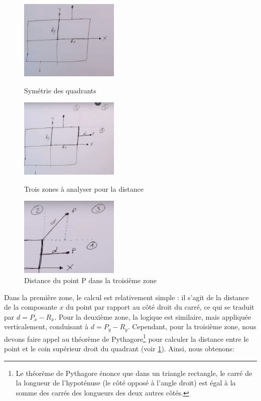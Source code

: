 \begin{figure}[h]
  \begin{minipage}[b]{0.30\linewidth}
    \centering
    \includegraphics[width=\linewidth, height=1.5in]{images//shaders/box00.png}
    \caption{Symétrie des quadrants}
    \label{box00}
  \end{minipage}
  \hspace{0.02\linewidth} %
  \begin{minipage}[b]{0.30\linewidth}
    \centering
    \includegraphics[width=\linewidth, height=1.5in]{images//shaders/box01.png}
    \caption{Trois zones à analyser pour la distance}
    \label{box01}
  \end{minipage}
  \hspace{0.02\linewidth} %
  \begin{minipage}[b]{0.30\linewidth}
    \centering
    \includegraphics[width=\linewidth, height=1.5in]{images//shaders/box02.png}
    \caption{Distance du point P dans la troisième zone}
    \label{box02}
  \end{minipage}
\end{figure}

Dans la première zone, le calcul est relativement simple : il s'agit de la distance de la composante $x$ du point par rapport au côté droit du carré, ce qui se traduit par $d = P_x - R_x$. Pour la deuxième zone, la logique est similaire, mais appliquée verticalement, conduisant à $d = P_y - R_y$. Cependant, pour la troisième zone, nous devons faire appel au théorème de Pythagore\footnote{Le théorème de Pythagore énonce que dans un triangle rectangle, le carré de la longueur de l'hypoténuse (le côté opposé à l'angle droit) est égal à la somme des carrés des longueurs des deux autres côtés.} pour calculer la distance entre le point et le coin supérieur droit du quadrant (voir \ref{box02}). Ainsi, nous obtenons:

